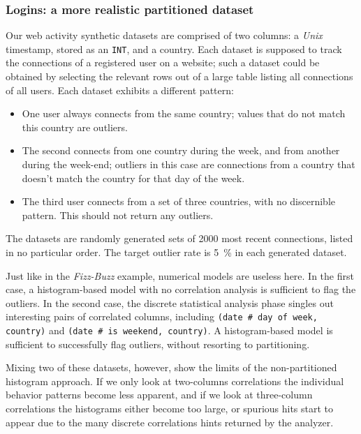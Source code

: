 \subsubsection{Logins: a more realistic partitioned dataset}

Our web activity synthetic datasets are comprised of two columns: a \emph{Unix} timestamp, stored as an \texttt{INT}, and a country. Each dataset is supposed to track the connections of a registered user on a website; such a dataset could be obtained by selecting the relevant rows out of a large table listing all connections of all users. Each dataset exhibits a different pattern:

\begin{itemize}
\item One user always connects from the same country; values that do not match this country are outliers.
\item The second connects from one country during the week, and from another during the week-end; outliers in this case are connections from a country that doesn't match the country for that day of the week.
\item The third user connects from a set of three countries, with no discernible pattern. This should not return any outliers.
\end{itemize}

The datasets are randomly generated sets of 2000 most recent connections, listed in no particular order. The target outlier rate is \SI{5}{\percent} in each generated dataset.

Just like in the \emph{Fizz-Buzz} example, numerical models are useless here. In the first case, a histogram-based model with no correlation analysis is sufficient to flag the outliers. In the second case, the discrete statistical analysis phase singles out interesting pairs of correlated columns, including \texttt{(date\,\#\,day of week, country)} and \texttt{(date\,\#\,is weekend, country)}. A histogram-based model is sufficient to successfully flag outliers, without resorting to partitioning.


Mixing two of these datasets, however, show the limits of the non-partitioned histogram approach. If we only look at two-columns correlations the individual behavior patterns become less apparent, and if we look at three-column correlations the histograms either become too large, or spurious hits start to appear due to the many discrete correlations hints returned by the analyzer.

